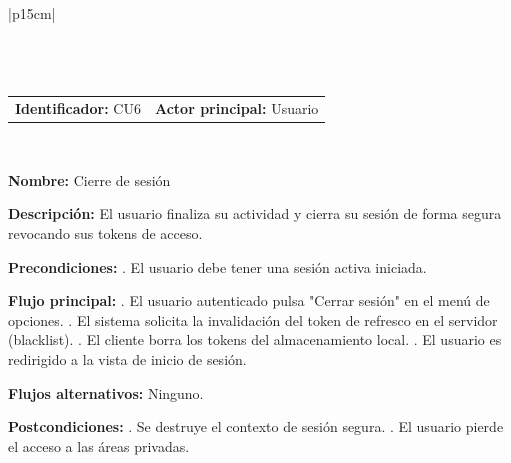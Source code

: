 \begingroup
{}
\setlength{\arrayrulewidth}{1pt}
\begin{longtable}{|p{15cm}|}
  \hline
   \\
  \hline
  \endfirsthead
   \\
  \hline
   \\
  \hline
  \endhead
  \hline {} \\ \hline
  \endfoot
  \hline
  \caption{Caso de Uso CU6 — Cierre de sesión.}
  \label{TB:CU6_LOGOUT}
  \endlastfoot

  \begin{tabularx}{\linewidth}{@{}X X@{}}
    \textbf{Identificador:} CU6 & \textbf{Actor principal:} Usuario
  \end{tabularx} \\ \hline

  \textbf{Nombre:} Cierre de sesión \\ \hline

  \textbf{Descripción:} \newline 
  El usuario finaliza su actividad y cierra su sesión de forma segura revocando sus tokens de acceso. \\ \hline

  \textbf{Precondiciones:} . El usuario debe tener una sesión activa iniciada. \\ \hline

  \textbf{Flujo principal:} . El usuario autenticado pulsa "Cerrar sesión" en el menú de opciones. . El sistema solicita la invalidación del token de refresco en el servidor (blacklist). . El cliente borra los tokens del almacenamiento local. . El usuario es redirigido a la vista de inicio de sesión. \\ \hline

  \textbf{Flujos alternativos:} \newline
  Ninguno. \\ \hline

  \textbf{Postcondiciones:} . Se destruye el contexto de sesión segura. . El usuario pierde el acceso a las áreas privadas. \\ \hline

\end{longtable}
\endgroup

